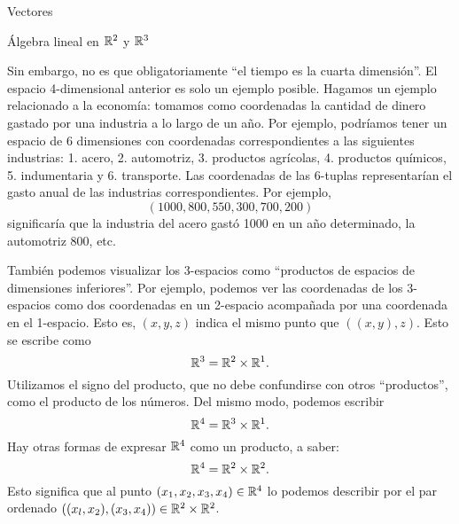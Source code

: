 \begin{chapter}{Vectores}
\begin{section}{\'Algebra lineal en $\mathbb R^2$ y $\mathbb R^3$}
\begin{ejemplo*}
            Sin embargo, no es que obligatoriamente ``el tiempo es la cuarta dimensión''. El espacio 4-dimensional anterior es solo un ejemplo posible. Hagamos un ejemplo relacionado a la economía: tomamos como coordenadas la cantidad de dinero gastado por una industria a lo largo de un año. 
            Por ejemplo, podríamos tener un espacio de 6 dimensiones con coordenadas correspondientes a las siguientes industrias: 1. acero, 2. automotriz, 3. productos agrícolas,  4. productos químicos, 5. indumentaria y 6. transporte. Las coordenadas de las 6-tuplas representarían el gasto anual de las industrias correspondientes. Por  ejemplo, 
            \begin{equation*}
            (1000, 800, 550, 300, 700, 200)
            \end{equation*}
            significaría que la industria del acero gastó 1000 en un año determinado, la automotriz 800, etc.
        \end{ejemplo*} 

        También podemos visualizar los 3-espacios  como ``productos de espacios de dimensiones inferiores''. Por ejemplo, podemos ver las coordenadas de los 3-espacios como dos coordenadas en un 2-espacio acompañada por una coordenada en el 1-espacio. Esto es, $(x,y,z)$ indica el mismo punto que $((x,y),z)$.  Esto se escribe como 
        \begin{equation*}
            \mathbb R^3 = \mathbb R^2 \times \mathbb R^1.
        \end{equation*}
        Utilizamos el signo del producto, que no debe confundirse con otros ``productos'', como el producto de los números. Del mismo modo, podemos escribir
        \begin{equation*}
        \mathbb R^4 = \mathbb R^3 \times \mathbb R^1.
        \end{equation*}
        Hay otras formas de expresar $\mathbb R^4$ como un producto, a saber:
        \begin{equation*}
        \mathbb R^4 = \mathbb R^2 \times \mathbb R^2.
        \end{equation*}
        Esto significa que al punto $(x_1,x_2,x_3,x_4)\in \mathbb R^4$  lo podemos describir por el par ordenado $((x_l, x_2),(x_3, x_4))\in \mathbb R^2 \times \mathbb R^2$. 
        

\end{section}
\end{chapter}
